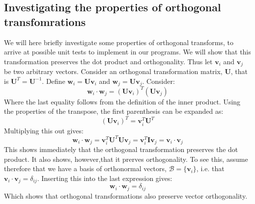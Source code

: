\documentclass[a4paper, 10pt]{article}
\begin{document}
\subsection{Investigating the properties of orthogonal transfomrations}
We will here briefly investigate some properties of orthogonal transforms, to arrive at possible unit tests to implement in our programs. 
We will show that this transformation preserves the dot product and orthogonality. Thus let $\mathbf{v}_i$ and $\mathbf{v}_j$ be two arbitrary vectors. Consider an orthogonal transformation matrix, $\mathbf{U}$, that is $\mathbf{U}^T=\mathbf{U}^{-1}$. Define $\mathbf{w}_i=\mathbf{U}\mathbf{v}_i$ and $\mathbf{w}_j=\mathbf{U}\mathbf{v}_j$. Consider:
$$\mathbf{w}_i \cdot \mathbf{w}_j=\left(\mathbf{U}\mathbf{v}_i\right)^T\left(\mathbf{U}\mathbf{v}_j\right)$$
Where the last equality follows from the definition of the inner product. Using the properties of the transpose, the first parenthesis can be expanded as:
$$\left(\mathbf{U}\mathbf{v}_i\right)^T = \mathbf{v}_i^T\mathbf{U}^T$$
Multiplying this out gives:
$$\mathbf{w}_i\cdot \mathbf{w}_j=\mathbf{v}_i^T\mathbf{U}^T\mathbf{U}\mathbf{v}_j=
\mathbf{v}_i^T\mathbf{I}\mathbf{v}_j=\mathbf{v}_i\cdot \mathbf{v}_j$$
This shows immediately that the orthogonal transformation preserves the dot product. It also shows, however,that it prerves orthogonality. To see this, assume therefore that we have a basis of orthonormal vectors, $\mathcal{B}=\{\mathbf{v}_i\}$, i.e. that $\mathbf{v}_i\cdot \mathbf{v}_j=\delta_{ij}$. Inserting this into the last expression gives:
$$\mathbf{w}_i\cdot \mathbf{w}_j=\delta_{ij}$$
Which shows that orthogonal transformations also preserve vector orthogonality.
\end{document}
